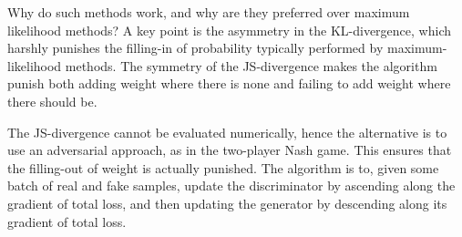 Why do such methods work, and why are they preferred over maximum likelihood methods? A key point is the asymmetry in the KL-divergence, which harshly punishes the filling-in of probability typically performed by maximum-likelihood methods. The symmetry of the JS-divergence makes the algorithm punish both adding weight where there is none and failing to add weight where there should be.

The JS-divergence cannot be evaluated numerically, hence the alternative is to use an adversarial approach, as in the two-player Nash game. This ensures that the filling-out of weight is actually punished. The algorithm is to, given some batch of real and fake samples, update the discriminator by ascending along the gradient of total loss, and then updating the generator by descending along its gradient of total loss.